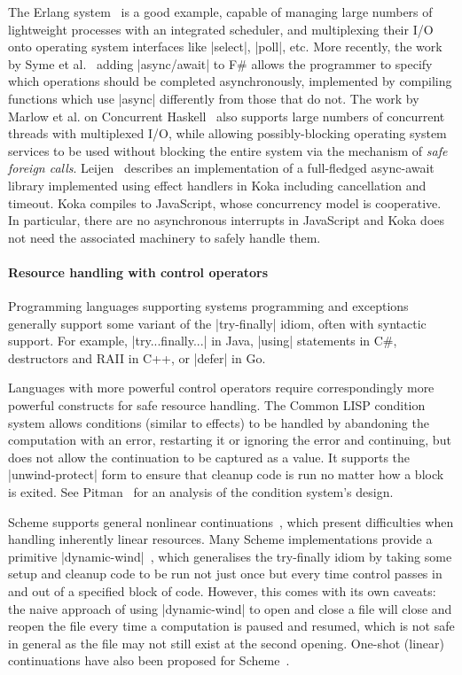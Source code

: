 \documentclass{llncs}
\begin{document}
The Erlang system~\citep*{armstrong1993erlang} is a good example, capable of
managing large numbers of lightweight processes with an integrated scheduler,
and multiplexing their I/O onto operating system interfaces like |select|,
|poll|, etc. More recently, the work by Syme et al.~\citep*{syme2011fsharp}
adding |async/await| to F\# allows the programmer to specify which operations
should be completed asynchronously, implemented by compiling functions which
use |async| differently from those that do not. The work by Marlow et al. on
Concurrent Haskell~\citep*{MarlowPJT04} also supports large numbers of
concurrent threads with multiplexed I/O, while allowing possibly-blocking
operating system services to be used without blocking the entire system via the
mechanism of \emph{safe foreign calls}. Leijen~\citep*{Leijen17A} describes an implementation of a
full-fledged async-await library implemented using effect handlers in Koka
including cancellation and timeout. Koka compiles to JavaScript, whose
concurrency model is cooperative. In particular, there are no asynchronous
interrupts in JavaScript and Koka does not need the associated machinery to
safely handle them.

\paragraph{Resource handling with control operators}

Programming languages supporting systems programming and exceptions generally
support some variant of the |try-finally| idiom, often with syntactic
support. For example, |try{...}finally{...}| in Java, |using| statements in C\#,
destructors and RAII in C++, or |defer| in Go.

Languages with more powerful control operators require correspondingly
more powerful constructs for safe resource handling. The Common LISP condition
system allows conditions (similar to effects) to be handled by abandoning the
computation with an error, restarting it or ignoring the error and continuing,
but does not allow the continuation to be captured as a value. It supports the
|unwind-protect| form to ensure that cleanup code is run no matter how a block
is exited. See Pitman~\citep*{pitman2001conditions} for an analysis of the
condition system's design.

Scheme supports general nonlinear continuations~\citep*{r5rs}, which present
difficulties when handling inherently linear resources. Many Scheme
implementations provide a primitive
|dynamic-wind|~\citep*{friedman1985control}, which generalises the try-finally
idiom by taking some setup and cleanup code to be run not just once but every
time control passes in and out of a specified block of code. However, this
comes with its own caveats: the naive approach of using |dynamic-wind| to open
and close a file will close and reopen the file every time a computation is
paused and resumed, which is not safe in general as the file may not still
exist at the second opening. One-shot (linear) continuations have also been
proposed for Scheme~\citep*{BruggemanWD96}.
\end{document}

